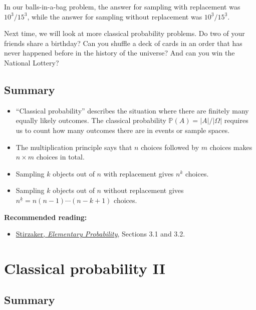 \documentclass[
  a4paper,
]{book}
\providecommand{\tightlist}{%
  \setlength{\itemsep}{0pt}\setlength{\parskip}{0pt}}
\theoremstyle{definition}
\theoremstyle{definition}
\theoremstyle{definition}
\theoremstyle{definition}
\theoremstyle{remark}
\begin{document}
In our balls-in-a-bag problem, the answer for sampling with replacement was \(10^3/15^3\), while the answer for sampling without replacement was \({10}^{\underline{3}}/{15}^{\underline{3}}\).

Next time, we will look at more classical probability problems. Do two of your friends share a birthday? Can you shuffle a deck of cards in an order that has never happened before in the history of the universe? And can you win the National Lottery?

\hypertarget{summary-L05}{%
\section*{Summary}\label{summary-L05}}

\begin{itemize}
\tightlist
\item
  ``Classical probability'' describes the situation where there are finitely many equally likely outcomes. The classical probability \(\mathbb P(A) = |A|/|\Omega|\) requires us to count how many outcomes there are in events or sample spaces.
\item
  The multiplication principle says that \(n\) choices followed by \(m\) choices makes \(n \times m\) choices in total.
\item
  Sampling \(k\) objects out of \(n\) with replacement gives \(n^k\) choices.
\item
  Sampling \(k\) objects out of \(n\) without replacement gives \(n^{\underline{k}} = n(n-1)\cdots(n-k+1)\) choices.
\end{itemize}

\textbf{Recommended reading:}

\begin{itemize}
\tightlist
\item
  \href{https://leeds.primo.exlibrisgroup.com/permalink/44LEE_INST/13rlbcs/alma991013131349705181}{Stirzaker, \emph{Elementary Probability}}, Sections 3.1 and 3.2.
\end{itemize}

\hypertarget{L06-classical-ii}{%
\chapter{Classical probability II}\label{L06-classical-ii}}

\hypertarget{summary-L06}{%
\section*{Summary}\label{summary-L06}}
\end{document}
